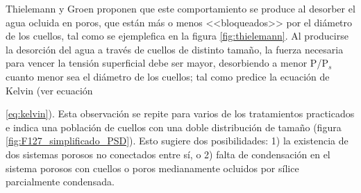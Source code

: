 			Thielemann \cite{Thielemann2011} y Groen\cite{Groen2003} proponen que este comportamiento se produce al desorber el agua ocluida en poros, que están más o menos <<bloqueados>> por el diámetro de los cuellos, tal como se ejemplefica en la figura \ref{fig:thielemann}. Al producirse la desorción del agua a través de cuellos de distinto tamaño, la fuerza  necesaria para vencer la tensión superficial debe ser mayor, desorbiendo a menor P/P$_s$ cuanto menor sea el diámetro de los cuellos; tal como predice la ecuación de Kelvin (ver ecuación {\ref{eq:kelvin}). Esta observación se repite para varios de los tratamientos practicados e indica una población de cuellos con una doble distribución de tamaño (figura \ref{fig:F127_simplificado_PSD}). Esto sugiere dos posibilidades: 1) la existencia de dos sistemas porosos no conectados entre sí, o 2) falta de condensación en el sistema porosos con cuellos o poros medianamente ocluidos por sílice parcialmente condensada.

}
